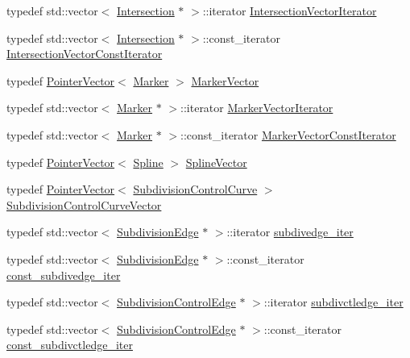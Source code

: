 \begin{DoxyCompactItemize}
\item 
typedef std\+::vector$<$ \hyperlink{classShipCAD_1_1Intersection}{Intersection} $\ast$ $>$\+::iterator \hyperlink{namespaceShipCAD_af8171e2e69ad8453d540aa87b159ad75}{Intersection\+Vector\+Iterator}
\item 
typedef std\+::vector$<$ \hyperlink{classShipCAD_1_1Intersection}{Intersection} $\ast$ $>$\+::const\+\_\+iterator \hyperlink{namespaceShipCAD_a354810638f1643d04b62af2d08fd21bd}{Intersection\+Vector\+Const\+Iterator}
\item 
typedef \hyperlink{classPointerVector}{Pointer\+Vector}$<$ \hyperlink{classShipCAD_1_1Marker}{Marker} $>$ \hyperlink{namespaceShipCAD_a36fff5b53986f6d6976afc749463ef22}{Marker\+Vector}
\item 
typedef std\+::vector$<$ \hyperlink{classShipCAD_1_1Marker}{Marker} $\ast$ $>$\+::iterator \hyperlink{namespaceShipCAD_a880f36455b3b35823ae14bdd62e20b31}{Marker\+Vector\+Iterator}
\item 
typedef std\+::vector$<$ \hyperlink{classShipCAD_1_1Marker}{Marker} $\ast$ $>$\+::const\+\_\+iterator \hyperlink{namespaceShipCAD_a6da02a910d5a7dac854646964af42933}{Marker\+Vector\+Const\+Iterator}
\item 
typedef \hyperlink{classPointerVector}{Pointer\+Vector}$<$ \hyperlink{classShipCAD_1_1Spline}{Spline} $>$ \hyperlink{namespaceShipCAD_a053b941b2c87049bb9380428d4d5a056}{Spline\+Vector}
\item 
typedef \hyperlink{classPointerVector}{Pointer\+Vector}$<$ \hyperlink{classShipCAD_1_1SubdivisionControlCurve}{Subdivision\+Control\+Curve} $>$ \hyperlink{namespaceShipCAD_aa9dd7a826ae5254e377dac43ea19da80}{Subdivision\+Control\+Curve\+Vector}
\item 
typedef std\+::vector$<$ \hyperlink{classShipCAD_1_1SubdivisionEdge}{Subdivision\+Edge} $\ast$ $>$\+::iterator \hyperlink{namespaceShipCAD_a7767250c742ad6114e3f076743d18461}{subdivedge\+\_\+iter}
\item 
typedef std\+::vector$<$ \hyperlink{classShipCAD_1_1SubdivisionEdge}{Subdivision\+Edge} $\ast$ $>$\+::const\+\_\+iterator \hyperlink{namespaceShipCAD_a42f420b898cf32478eeab87aa058e024}{const\+\_\+subdivedge\+\_\+iter}
\item 
typedef std\+::vector$<$ \hyperlink{classShipCAD_1_1SubdivisionControlEdge}{Subdivision\+Control\+Edge} $\ast$ $>$\+::iterator \hyperlink{namespaceShipCAD_a622b92c46380228698ff1e0e1d78aa3a}{subdivctledge\+\_\+iter}
\item 
typedef std\+::vector$<$ \hyperlink{classShipCAD_1_1SubdivisionControlEdge}{Subdivision\+Control\+Edge} $\ast$ $>$\+::const\+\_\+iterator \hyperlink{namespaceShipCAD_af78c33b3ea7d42b713572baf86e2b01a}{const\+\_\+subdivctledge\+\_\+iter}

\end{DoxyCompactItemize}
